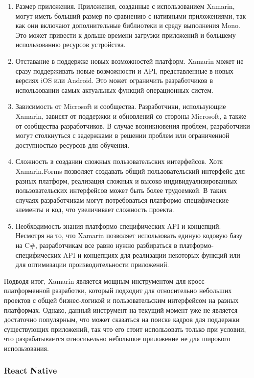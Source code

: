 \documentclass[14pt, russian]{scrartcl}
\begin{document}
\begin{enumerate}
    \item Размер приложения. Приложения, созданные с использованием Xamarin, могут иметь больший размер по сравнению с нативными приложениями, так как они включают дополнительные библиотеки и среду выполнения Mono. Это может привести к дольше времени загрузки приложений и большему использованию ресурсов устройства.
    \item Отставание в поддержке новых возможностей платформ. Xamarin может не сразу поддерживать новые возможности и API, представленные в новых версиях iOS или Android. Это может ограничить разработчиков в использовании самых актуальных функций операционных систем.
    \item Зависимость от Microsoft и сообщества. Разработчики, использующие Xamarin, зависят от поддержки и обновлений со стороны Microsoft, а также от сообщества разработчиков. В случае возникновения проблем, разработчики могут столкнуться с задержками в решении проблем или ограниченной доступностью ресурсов для обучения.
    \item Сложность в создании сложных пользовательских интерфейсов. Хотя Xamarin.Forms позволяет создавать общий пользовательский интерфейс для разных платформ, реализация сложных и высоко индивидуализированных пользовательских интерфейсов может быть более трудоемкой. В таких случаях разработчикам могут потребоваться платформо-специфические элементы и код, что увеличивает сложность проекта.
    \item Необходимость знания платформо-специфических API и концепций. Несмотря на то, что Xamarin позволяет использовать единую кодовую базу на C\#, разработчикам все равно нужно разбираться в платформо-специфических API и концепциях для реализации некоторых функций или для оптимизации производительности приложений.
\end{enumerate}

Подводя итог, Xamarin является мощным инструментом для кросс-платформенной разработки, который подходит для относительно небольших проектов с общей бизнес-логикой и пользовательским интерфейсом на разных платформах. Однако, данный инструмент на текущий момент уже не является достаточно популярным, что может сказаться на поиске кадров для поддержки существующих приложений, так что его стоит использовать только при условии, что разрабатывается относиьельно небольшое приложение не для широкого использования.

\subsubsection{React Native}\label{sect:rn}
\end{document}

